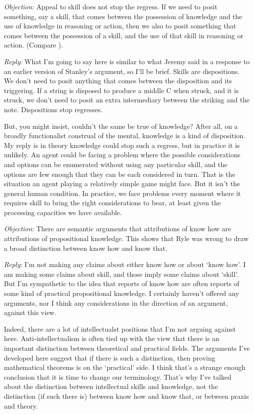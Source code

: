 \emph{Objection}: Appeal to skill does not stop the regress. If we need to posit something, say a skill, that comes between the possession of knowledge and the use of knowledge in reasoning or action, then we also to posit something that comes between the possession of a skill, and the use of that skill in reasoning or action. (Compare \cite[p. 26]{Stanley2011}).

\emph{Reply}: What I'm going to say here is similar to what Jeremy \citet{Fantl2011} said in a response to an earlier version of Stanley's argument, so I'll be brief. Skills are dispositions. We don't need to posit anything that comes between the disposition and its triggering. If a string is disposed to produce a middle C when struck, and it is struck, we don't need to posit an extra intermediary between the striking and the note. Dispositions stop regresses.

But, you might insist, couldn't the same be true of knowledge? After all, on a broadly functionalist construal of the mental, knowledge is a kind of disposition. My reply is in theory knowledge could stop such a regress, but in practice it is unlikely. An agent could be facing a problem where the possible considerations and options can be enumerated without using any particular skill, and the options are few enough that they can be each considered in turn. That is the situation an agent playing a relatively simple game might face. But it isn't the general human condition. In practice, we face problems every moment where it requires skill to bring the right considerations to bear, at least given the processing capacities we have available.

\emph{Objection}: There are semantic arguments that attributions of know how are attributions of propositional knowledge. This shows that Ryle was wrong to draw a broad distinction between know how and know that.

\emph{Reply}: I'm not making any claims about either know how or about `know how'. I am making some claims about skill, and those imply some claims about `skill'. But I'm sympathetic to the idea that reports of know how are often reports of some kind of practical propositional knowledge. I certainly haven't offered any arguments, nor I think any considerations in the direction of an argument, against this view.

Indeed, there are a lot of intellectualst positions that I'm not arguing against here. Anti-intellectualism is often tied up with the view that there is an important distinction between theoretical and practical fields. The arguments I've developed here suggest that if there is such a distinction, then proving mathematical theorems is on the `practical' side. I think that's a strange enough conclusion that it is time to change our terminology. That's why I've talked about the distinction between intellectual skills and knowledge, not the distinction (if such there is) between know how and know that, or between praxis and theory.

